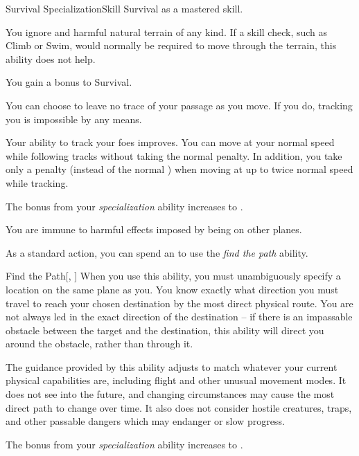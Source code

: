     \begin{feat}{Survival Specialization}{Skill}
        \featpre Survival as a mastered skill.

         You ignore  and harmful natural terrain of any kind.
        If a skill check, such as Climb or Swim, would normally be required to move through the terrain, this ability does not help.

         You gain a  bonus to Survival.

         You can choose to leave no trace of your passage as you move.
        If you do, tracking you is impossible by any  means.

        Your ability to track your foes improves.
        You can move at your normal speed while following tracks without taking the normal  penalty.
        In addition, you take only a  penalty (instead of the normal ) when moving at up to twice normal speed while tracking.

         The bonus from your \textit{specialization} ability increases to .

         You are immune to harmful effects imposed by being on other planes.

         As a standard action, you can spend an  to use the \textit{find the path} ability.
        \begin{ability}{Find the Path}[, ]
            When you use this ability, you must unambiguously specify a location on the same plane as you.
            You know exactly what direction you must travel to reach your chosen destination by the most direct physical route.
            You are not always led in the exact direction of the destination -- if there is an impassable obstacle between the target and the destination, this ability will direct you around the obstacle, rather than through it.

            The guidance provided by this ability adjusts to match whatever your current physical capabilities are, including flight and other unusual movement modes. It does not see into the future, and changing circumstances may cause the most direct path to change over time.
            It also does not consider hostile creatures, traps, and other passable dangers which may endanger or slow progress.
        \end{ability}

         The bonus from your \textit{specialization} ability increases to .
    \end{feat}

